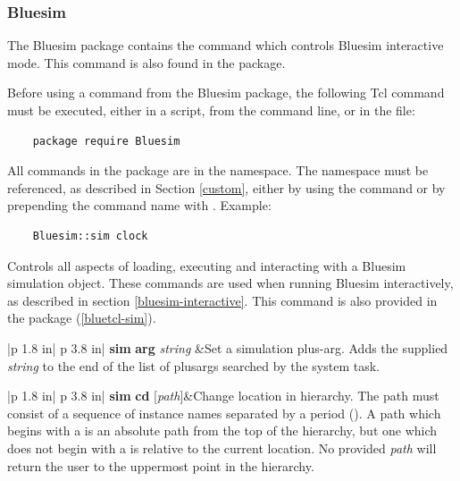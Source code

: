 
\subsubsection{Bluesim}

The Bluesim package contains the  command which controls
Bluesim interactive mode.  This command is also found in the
 package.

Before using a command from the Bluesim package,  the
following Tcl command must  be executed, either in a script, 
from the command line, or in the  file:
\begin{verbatim}
    package require Bluesim
\end{verbatim}

All commands in the  package are in the  
namespace.  The namespace must be referenced, as described in Section
\ref{custom}, either by using the  command or by
prepending the command name with .  Example:
\begin{verbatim}
    Bluesim::sim clock
\end{verbatim}


\label{bluesim-sim}

 Controls all aspects of loading, executing and interacting
with a Bluesim simulation object.  These commands are used when
running Bluesim interactively, as described in section \ref {bluesim-interactive}. 
This command is also provided in the  package (\ref{bluetcl-sim}).

\begin{tabular}{|p {1.8 in}| p {3.8 in}|}
\hline
\hline
{\bf sim} {\bf arg} {\em string} &Set a simulation plus-arg. Adds the supplied
{\em string} to the end of the list of plusargs searched by the
 system task. \\
\hline
\end{tabular}

\begin{tabular}{|p {1.8 in}| p {3.8 in}|}
\hline
{\bf sim} {\bf  cd} [{\em path}]&Change location in hierarchy.   The
path must consist of a sequence of instance names separated by a
period ().  A path which begins with a  is an absolute
path from the top of the hierarchy, but one which does not begin with
a  is relative to the current location.  No provided {\em path} will
return the user to the uppermost point in the hierarchy.\\
\hline
\end{tabular}

